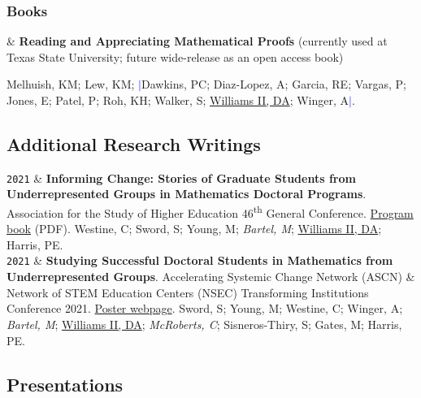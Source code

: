 \documentclass[11pt]{article}
\newcommand{\LastName}{Williams II}
\newcommand{\Initials}{DA}
\newcommand{\Me}{\underline{\LastName, \Initials}}  %
\newcommand{\PEH}{Harris, PE}
\newcommand{\Rebecca}{Garcia, RE}
\newcommand{\Michael}{Young, M}
\newcommand{\Sarah}{Sword, S}
\newcommand{\Aris}{Winger, A}
\newcommand{\Christian}{McRoberts, C}
\newcommand{\Maya}{Bartel, M}
\newcommand{\Simone}{Sisneros-Thiry, S}
\newcommand{\Miriam}{Gates, M}
\newcommand{\Carl}{Westine, C}
\newcommand{\Shanise}{Walker, S}
\newcommand{\Pamela}{Vargas, P}
\newcommand{\Kate}{Melhuish, KM}
\newcommand{\Kristen}{Lew, KM}
\newcommand{\Paul}{Dawkins, PC}
\newcommand{\Alexander}{Diaz-Lopez, A}
\newcommand{\KyeongHah}{Roh, KH}
\newcommand{\Edna}{Jones, E}
\newcommand{\Priyam}{Patel, P}
\newcommand{\GradCollab}[1]{\textit{#1}}
\newcommand{\Year}[1]{\fontsize{10pt}{0}\selectfont \texttt{#1}}
\begin{document}
    \subsubsection{Books}
\begin{EntriesTableYear}
\Year{} &
\textbf{Reading and Appreciating Mathematical Proofs} (currently used at Texas State University; future wide-release as an open access book) \addtocounter{matheducationwriteBookChapterCount}{1}
\Kate; \Kristen;
\textcolor{blue}{$\big|$}\Paul; \Alexander; \Rebecca; \Pamela; \Edna; \Priyam; \KyeongHah; \Shanise; \Me; \Aris\textcolor{blue}{$\big|$}.
\end{EntriesTableYear}

\subsection{Additional Research Writings}
\begin{EntriesTableYear}

\Year{2021}  &
  \textbf{Informing Change: Stories of Graduate Students from Underrepresented Groups in Mathematics Doctoral Programs}.
  \newline
  Association for the Study of Higher Education 46\textsuperscript{th} General Conference. \href{https://web.archive.org/web/20221105071519/https://www.ashe.ws//Files/Past Conferences/ASHE 2021 Program Book.pdf}{Program book} (PDF).
  \newline
  \Carl; \Sarah; \Michael; \GradCollab{\Maya}; \Me; \PEH.
  \\
\Year{2021}  &
  \textbf{Studying Successful Doctoral Students in Mathematics from Underrepresented Groups}.
  \newline
  Accelerating Systemic Change Network (ASCN) \& Network of STEM Education Centers (NSEC) Transforming Institutions Conference 2021. \href{https://ascnhighered.org/ASCN/transforming_institutions/2021/program/posters/session_c/2/243631.html}{Poster webpage}.
  \newline
  \Sarah; \Michael; \Carl; \Aris; \GradCollab{\Maya}; \Me; \GradCollab{\Christian}; \Simone; \Miriam; \PEH.
 \end{EntriesTableYear}

 \endgroup
\setmainfont{CMU Serif}
\setsansfont{CMU Sans Serif}
\setmonofont{CMU Typewriter Text}


\subsection{Presentations}
\end{document}

